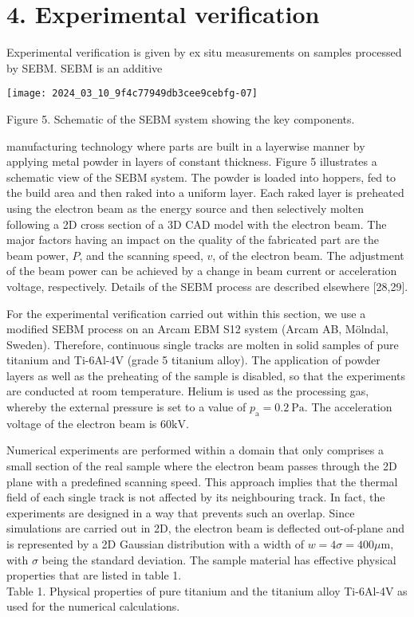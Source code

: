 \documentclass[10pt]{article}
\begin{document}
\section*{4. Experimental verification}
Experimental verification is given by ex situ measurements on samples processed by SEBM. SEBM is an additive

\begin{center}
\texttt{[image: 2024\_03\_10\_9f4c77949db3cee9cebfg-07]}
\end{center}

Figure 5. Schematic of the SEBM system showing the key components.

manufacturing technology where parts are built in a layerwise manner by applying metal powder in layers of constant thickness. Figure 5 illustrates a schematic view of the SEBM system. The powder is loaded into hoppers, fed to the build area and then raked into a uniform layer. Each raked layer is preheated using the electron beam as the energy source and then selectively molten following a 2D cross section of a 3D CAD model with the electron beam. The major factors having an impact on the quality of the fabricated part are the beam power, $P$, and the scanning speed, $v$, of the electron beam. The adjustment of the beam power can be achieved by a change in beam current or acceleration voltage, respectively. Details of the SEBM process are described elsewhere [28,29].

For the experimental verification carried out within this section, we use a modified SEBM process on an Arcam EBM S12 system (Arcam AB, Mölndal, Sweden). Therefore, continuous single tracks are molten in solid samples of pure titanium and Ti-6Al-4V (grade 5 titanium alloy). The application of powder layers as well as the preheating of the sample is disabled, so that the experiments are conducted at room temperature. Helium is used as the processing gas, whereby the external pressure is set to a value of $p_{\mathrm{a}}=0.2 \mathrm{~Pa}$. The acceleration voltage of the electron beam is $60 \mathrm{kV}$.

Numerical experiments are performed within a domain that only comprises a small section of the real sample where the electron beam passes through the 2D plane with a predefined scanning speed. This approach implies that the thermal field of each single track is not affected by its neighbouring track. In fact, the experiments are designed in a way that prevents such an overlap. Since simulations are carried out in 2D, the electron beam is deflected out-of-plane and is represented by a 2D Gaussian distribution with a width of $w=4 \sigma=400 \mu \mathrm{m}$, with $\sigma$ being the standard deviation. The sample material has effective physical properties that are listed in table 1.\\
Table 1. Physical properties of pure titanium and the titanium alloy Ti-6Al-4V as used for the numerical calculations.
\end{document}
